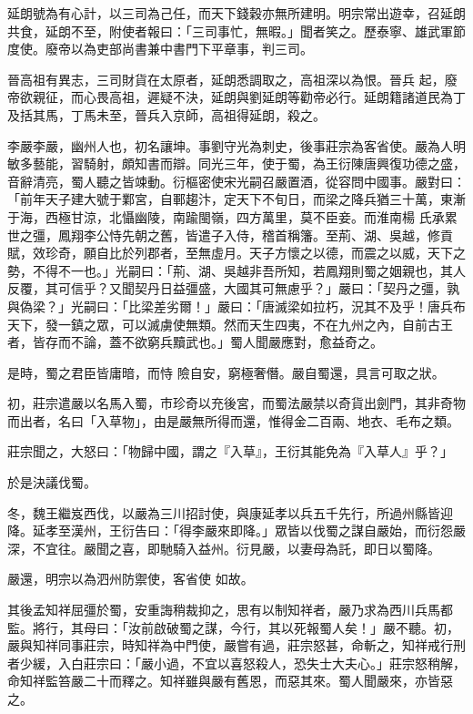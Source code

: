 \begin{pinyinscope}
 延朗號為有心計，以三司為己任，而天下錢穀亦無所建明。明宗常出遊幸，召延朗共食，延朗不至，附使者報曰：「三司事忙，無暇。」聞者笑之。歷泰寧、雄武軍節度使。廢帝以為吏部尚書兼中書門下平章事，判三司。



 晉高祖有異志，三司財貨在太原者，延朗悉調取之，高祖深以為恨。晉兵
 起，廢帝欲親征，而心畏高祖，遲疑不決，延朗與劉延朗等勸帝必行。延朗籍諸道民為丁及括其馬，丁馬未至，晉兵入京師，高祖得延朗，殺之。



 李嚴李嚴，幽州人也，初名讓坤。事劉守光為刺史，後事莊宗為客省使。嚴為人明敏多藝能，習騎射，頗知書而辯。同光三年，使于蜀，為王衍陳唐興復功德之盛，音辭清亮，蜀人聽之皆竦動。衍樞密使宋光嗣召嚴置酒，從容問中國事。嚴對曰：「前年天子建大號于鄴宮，自鄆趨汴，定天下不旬日，而梁之降兵猶三十萬，東漸于海，西極甘涼，北懾幽陵，南踰閩嶺，四方萬里，莫不臣妾。而淮南楊
 氏承累世之彊，鳳翔李公恃先朝之舊，皆遣子入侍，稽首稱籓。至荊、湖、吳越，修貢賦，效珍奇，願自比於列郡者，至無虛月。天子方懷之以德，而震之以威，天下之勢，不得不一也。」光嗣曰：「荊、湖、吳越非吾所知，若鳳翔則蜀之姻親也，其人反覆，其可信乎？又聞契丹日益彊盛，大國其可無慮乎？」嚴曰：「契丹之彊，孰與偽梁？」光嗣曰：「比梁差劣爾！」嚴曰：「唐滅梁如拉朽，況其不及乎！唐兵布天下，發一鎮之眾，可以滅虜使無類。然而天生四夷，不在九州之內，自前古王者，皆存而不論，蓋不欲窮兵黷武也。」蜀人聞嚴應對，愈益奇之。



 是時，蜀之君臣皆庸暗，而恃
 險自安，窮極奢僭。嚴自蜀還，具言可取之狀。



 初，莊宗遣嚴以名馬入蜀，市珍奇以充後宮，而蜀法嚴禁以奇貨出劍門，其非奇物而出者，名曰「入草物」，由是嚴無所得而還，惟得金二百兩、地衣、毛布之類。



 莊宗聞之，大怒曰：「物歸中國，謂之『入草』，王衍其能免為『入草人』乎？」



 於是決議伐蜀。



 冬，魏王繼岌西伐，以嚴為三川招討使，與康延孝以兵五千先行，所過州縣皆迎降。延孝至漢州，王衍告曰：「得李嚴來即降。」眾皆以伐蜀之謀自嚴始，而衍怨嚴深，不宜往。嚴聞之喜，即馳騎入益州。衍見嚴，以妻母為託，即日以蜀降。



 嚴還，明宗以為泗州防禦使，客省使
 如故。



 其後孟知祥屈彊於蜀，安重誨稍裁抑之，思有以制知祥者，嚴乃求為西川兵馬都監。將行，其母曰：「汝前啟破蜀之謀，今行，其以死報蜀人矣！」嚴不聽。初，嚴與知祥同事莊宗，時知祥為中門使，嚴嘗有過，莊宗怒甚，命斬之，知祥戒行刑者少緩，入白莊宗曰：「嚴小過，不宜以喜怒殺人，恐失士大夫心。」莊宗怒稍解，命知祥監笞嚴二十而釋之。知祥雖與嚴有舊恩，而惡其來。蜀人聞嚴來，亦皆惡之。




\end{pinyinscope}
